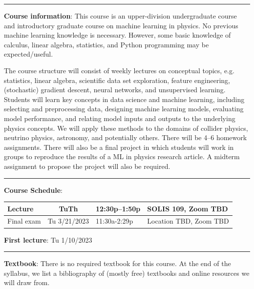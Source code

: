 \documentclass[12pt]{article}
\begin{document}
\begin{center}
	\rule{\textwidth}{0.5pt}
\end{center}

\noindent\textbf{Course information}: This course is an upper-division undergraduate course and introductory graduate course on machine learning in physics.
No previous machine learning knowledge is necessary.
However, some basic knowledge of calculus, linear algebra, statistics, and Python programming may be expected/useful.

The course structure will consist of weekly lectures on conceptual topics, e.g. statistics, linear algebra, scientific data set exploration, feature engineering, (stochastic) gradient descent, neural networks, and unsupervised learning.
Students will learn key concepts in data science and machine learning, including selecting and preprocessing data, designing machine learning models, evaluating model performance, and relating model inputs and outputs to the underlying physics concepts.
We will apply these methods to the domains of collider physics, neutrino physics, astronomy, and potentially others.
There will be 4--6 homework assignments.
There will also be a final project in which students will work in groups to reproduce the results of a ML in physics research article.
A midterm assignment to propose the project will also be required.

\begin{center}
	\rule{\textwidth}{0.5pt}
\end{center}

\noindent\textbf{Course Schedule}:
\begin{center}
	\begin{tabular}{|l|c|l|m{50mm}|}
		\hline
		Lecture    & TuTh         & 12:30p--1:50p & SOLIS 109, Zoom TBD    \\\hline
		Final exam & Tu 3/21/2023 & 11:30a-2:29p  & Location TBD, Zoom TBD \\\hline
	\end{tabular}
\end{center}

\noindent\textbf{First lecture}: Tu 1/10/2023

\begin{center}
	\rule{\textwidth}{0.5pt}
\end{center}

\noindent\textbf{Textbook}: There is no required textbook for this course.
At the end of the syllabus, we list a bibliography of (mostly free) textbooks and online resources we will draw from.
\end{document}
